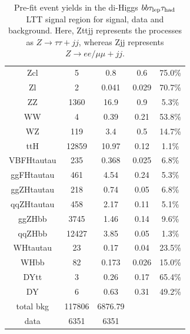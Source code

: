 \begin{table}
\begin{tabular}{|c|c|c|c|c|}
Zcl             &                 5   &       0.8                  &            0.6              &        75.0\%  \\
Zl             &                  2   &      0.041                  &            0.029              &        70.7\%  \\
ZZ             &               1360   &      16.9                  &            0.9              &        5.3\%  \\
WW             &                  4   &      0.39                  &            0.21              &        53.8\%  \\
WZ             &                119   &      3.4                  &            0.5              &        14.7\%  \\
ttH             &             12859   &       10.97                  &            0.12              &        1.1\%  \\
VBFHtautau             &        235   &              0.368                  &            0.025              &        6.8\%  \\
ggFHtautau             &        461   &              4.54                  &            0.24              &        5.3\%  \\
ggZHtautau             &        218   &              0.74                  &            0.05              &        6.8\%  \\
qqZHtautau             &        458   &              2.17                  &            0.11              &        5.1\%  \\
ggZHbb             &           3745   &          1.46                  &            0.14              &        9.6\%  \\
qqZHbb             &          12427   &          3.85                  &            0.05              &        1.3\%  \\
WHtautau             &           23   &            0.17                  &            0.04              &        23.5\%  \\
WHbb             &               82   &        0.173                  &            0.026              &        15.0\%  \\
DYtt             &                3   &        0.26                  &            0.17              &        65.4\%  \\
DY             &                  6   &      0.63                  &            0.31              &        49.2\%  \\
\hline
total bkg 	&	117806	  &	   6876.79  &  & \\		
data		& 	6351      &    6351 	&  &   \\
\hline
\hline

  \end{tabular}
  \caption{Pre-fit event yields in the di-Higgs $bb\tau_{\mathrm{lep}}\tau_{\mathrm{had}}$ LTT signal region for signal, data and background. Here, Zttjj represents the processes as $Z\rightarrow\tau\tau + jj$, 
  whereas Zjj represents  $Z\rightarrow ee/\mu\mu + jj$.}
  \label{tab:LepHadLTTYields}
\end{table}


